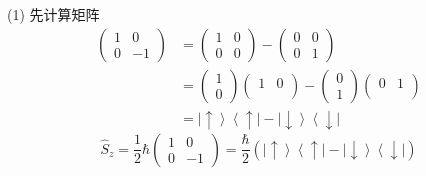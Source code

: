 \begin{frame}[label=current]
  \frametitle{}
\证 (1) 先计算矩阵
\[ \begin{aligned}
  \begin{pmatrix}
    1 & 0\\
    0 & -1
   \end{pmatrix} &=  \begin{pmatrix}
    1 & 0\\
    0 & 0
   \end{pmatrix}  -
   \begin{pmatrix}
    0 & 0\\
    0 & 1
   \end{pmatrix}\\ 
   &= \begin{pmatrix}
    1 \\
    0 
   \end{pmatrix} \begin{pmatrix}
    1 & 0 \\ 
   \end{pmatrix} - \begin{pmatrix}
    0 \\
    1 
   \end{pmatrix} \begin{pmatrix}
    0 & 1 \\ 
   \end{pmatrix} \\
   &= \left\vert \uparrow \right\rangle\left\langle  \uparrow\right\vert - \left\vert \downarrow \right\rangle\left\langle  \downarrow\right\vert
\end{aligned}\]
\[\hat{S}_z = \frac{1}{2}\hbar\begin{pmatrix}
  1 & 0\\
  0 & -1
 \end{pmatrix} = \frac{\hbar}{2}\left(\left\vert \uparrow \right\rangle\left\langle  \uparrow\right\vert - \left\vert \downarrow \right\rangle\left\langle  \downarrow\right\vert\right)\]
\end{frame} 

